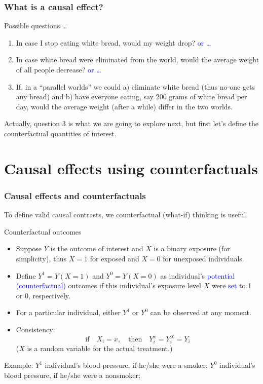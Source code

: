 \documentclass[10pt,dvipsnames,t,handout%
,aspectratio=169%
]{beamer}%
\newcommand{\sini}[1]{\textcolor{Blue}{#1}}
\newcommand{\puna}[1]{\textcolor{BrickRed}{#1}}
\begin{document}
\begin{frame}
	\frametitle{What is a causal effect?}
	\begin{block}{Possible questions \ldots}
		 	\begin{enumerate}
		\item In case I stop eating white bread, would my weight drop?  \quad \sini{or \ldots} 
		\item In case white bread were eliminated from the world, would the average weight of all people decrease?  \quad \sini{or \ldots} 
		\item If, in a ``parallel worlds'' we could a) eliminate white bread (thus no-one gets any bread) and b) have everyone eating, say 200 grams of white bread per day, would the average weight (after a while) differ in the two worlds. 
	\end{enumerate}
			\end{block}
		Actually, question 3 is what we are going to explore next, but first let's define the counterfactual quantities of interest.
\end{frame}

\section{Causal effects using counterfactuals}

\begin{frame}
\frametitle{Causal effects and counterfactuals}


To define valid causal contrasts, we \puna{counterfactual} (what-if) thinking is useful.
\begin{block}{Counterfactual outcomes}
\begin{itemize}
\item Suppose $Y$ is the outcome of interest and  $X$ is a binary exposure (for simplicity), thus $X=1$ for exposed and $X=0$ for unexposed individuals.
\item Define $Y^1=Y(X=1)$ and $Y^0=Y(X=0)$  as individual's \sini{potential (counterfactual)} outcomes if this individual's exposure level $X$ were \sini{set} to 1 or 0, respectively. 
\item For a particular individual, either $Y^1$ or $Y^0$ can be observed at any moment. 
\item Consistency: 
$$\text{if} \quad X_i=x, \quad \text{then} \quad Y_i^x=Y_i^X=Y_i$$
($X$ is a random variable for the actual treatment.)
\end{itemize}
\end{block}
Example: $Y^1$ individual's blood pressure, if he/she were a smoker; $Y^0$ individual's blood pressure, if he/she were a nonsmoker;

\end{frame}
\end{document}
